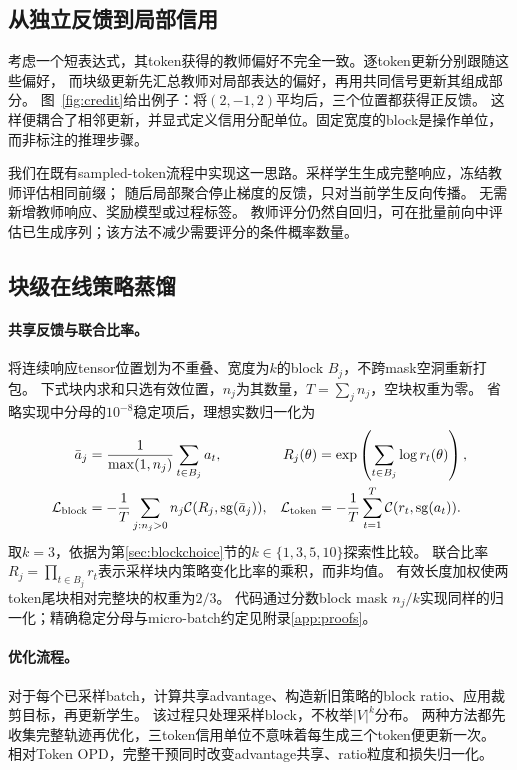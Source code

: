 \subsection{从独立反馈到局部信用}
考虑一个短表达式，其token获得的教师偏好不完全一致。逐token更新分别跟随这些偏好，
而块级更新先汇总教师对局部表达的偏好，再用共同信号更新其组成部分。
图~\ref{fig:credit}给出例子：将$(2,-1,2)$平均后，三个位置都获得正反馈。
这样便耦合了相邻更新，并显式定义信用分配单位。固定宽度的block是操作单位，而非标注的推理步骤。

我们在既有sampled-token流程中实现这一思路。采样学生生成完整响应，冻结教师评估相同前缀；
随后局部聚合停止梯度的反馈，只对当前学生反向传播。
无需新增教师响应、奖励模型或过程标签。
教师评分仍然自回归，可在批量前向中评估已生成序列；该方法不减少需要评分的条件概率数量。

\subsection{块级在线策略蒸馏}
\paragraph{共享反馈与联合比率。}
将连续响应tensor位置划为不重叠、宽度为$k$的block $B_j$，不跨mask空洞重新打包。
下式块内求和只选有效位置，$n_j$为其数量，$T=\sum_j n_j$，空块权重为零。
省略实现中分母的$10^{-8}$稳定项后，理想实数归一化为
\begin{align}
 \bar a_j&=\frac{1}{\max(1,n_j)}\sum_{t\in B_j}a_t,
 &R_j(\theta)&=\exp\left(\sum_{t\in B_j}\log r_t(\theta)\right),\label{eq:block}\\
 \mathcal L_{\mathrm{block}}&=-\frac1T\sum_{j:n_j>0}n_j\mathcal C(R_j,\operatorname{sg}(\bar a_j)),
 &\mathcal L_{\mathrm{token}}&=-\frac1T\sum_{t=1}^T\mathcal C(r_t,\operatorname{sg}(a_t)).\label{eq:loss}
\end{align}
\method{}取$k=3$，依据为第\ref{sec:blockchoice}节的$k\in\{1,3,5,10\}$探索性比较。
联合比率$R_j=\prod_{t\in B_j}r_t$表示采样块内策略变化比率的乘积，而非均值。
有效长度加权使两token尾块相对完整块的权重为$2/3$。
代码通过分数block mask $n_j/k$实现同样的归一化；精确稳定分母与micro-batch约定见附录\ref{app:proofs}。

\paragraph{优化流程。}
对于每个已采样batch，计算共享advantage、构造新旧策略的block ratio、应用裁剪目标，再更新学生。
该过程只处理采样block，不枚举$|V|^k$分布。
两种方法都先收集完整轨迹再优化，三token信用单位不意味着每生成三个token便更新一次。
相对Token OPD，完整干预同时改变advantage共享、ratio粒度和损失归一化。

